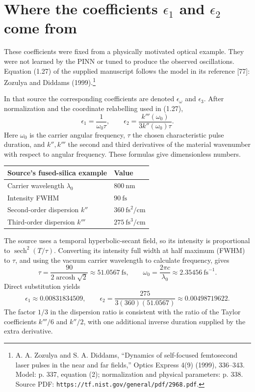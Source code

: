 \clearpage
\section{Where the coefficients $\epsilon_1$ and $\epsilon_2$ come from}
These coefficients were fixed from a physically motivated optical example. They were not learned by the PINN or tuned to produce the observed oscillations. Equation (1.27) of the supplied manuscript follows the model in its reference [77]: Zozulya and Diddams (1999).\footnote{A. A. Zozulya and S. A. Diddams, ``Dynamics of self-focused femtosecond laser pulses in the near and far fields,'' Optics Express 4(9) (1999), 336--343. Model: p. 337, equation (2); normalization and physical parameters: p. 338. Source PDF: \texttt{https://tf.nist.gov/general/pdf/2968.pdf}.}

In that source the corresponding coefficients are denoted $\epsilon_\omega$ and $\epsilon_3$. After normalization and the coordinate relabelling used in (1.27),
\[
\boxed{\epsilon_1=\frac{1}{\omega_0\tau}},\qquad
\boxed{\epsilon_2=\frac{k'''(\omega_0)}{3k''(\omega_0)\tau}}.
\]
Here $\omega_0$ is the carrier angular frequency, $\tau$ the chosen characteristic pulse duration, and $k'',k'''$ the second and third derivatives of the material wavenumber with respect to angular frequency. These formulas give dimensionless numbers.
\begin{center}\begin{tabular}{ll}\toprule
Source's fused-silica example & Value\\\midrule
Carrier wavelength $\lambda_0$ & $800\ \mathrm{nm}$\\
Intensity FWHM & $90\ \mathrm{fs}$\\
Second-order dispersion $k''$ & $360\ \mathrm{fs}^2/\mathrm{cm}$\\
Third-order dispersion $k'''$ & $275\ \mathrm{fs}^3/\mathrm{cm}$\\\bottomrule\end{tabular}\end{center}
The source uses a temporal hyperbolic-secant field, so its intensity is proportional to $\operatorname{sech}^2(T/\tau)$. Converting its intensity full width at half maximum (FWHM) to $\tau$, and using the vacuum carrier wavelength to calculate frequency, gives
\[
\tau=\frac{90}{2\operatorname{arcosh}\sqrt2}\approx51.0567\ \mathrm{fs},
\qquad \omega_0=\frac{2\pi c}{\lambda_0}\approx2.35456\ \mathrm{fs}^{-1}.
\]
Direct substitution yields
\[
\epsilon_1\approx0.00831834509,\qquad
\epsilon_2=\frac{275}{3(360)(51.0567)}\approx0.00498719622.
\]
The factor $1/3$ in the dispersion ratio is consistent with the ratio of the Taylor coefficients $k'''/6$ and $k''/2$, with one additional inverse duration supplied by the extra derivative.

